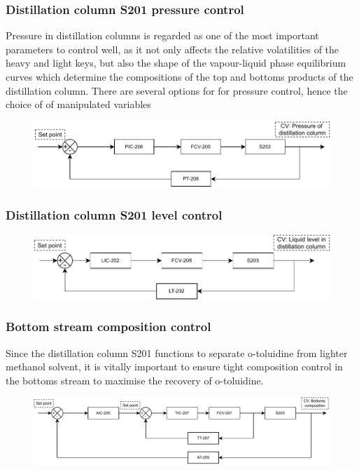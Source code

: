 \subsubsection{Distillation column S201 pressure control}
Pressure in distillation columns is regarded as one of the most important parameters to control well, as it not only affects the relative volatilities of the heavy and light keys, but also the shape of the vapour-liquid phase equilibrium curves which determine the compositions of the top and bottoms products of the distillation column. There are several options for for pressure control, hence the choice of of manipulated variables 
\begin{figure}[H]
    \centering
    \includegraphics[width=\linewidth]{chapters/4-operation-control/4-Figures/S203-PC.pdf}
    \caption{}
    \label{fig:S203-PC}
\end{figure}

\subsubsection{Distillation column S201 level control}
\begin{figure}[H]
    \centering
    \includegraphics[width=\linewidth]{chapters/4-operation-control/4-Figures/S203-LC.pdf}
    \caption{}
    \label{fig:S203-LC}
\end{figure}

\subsubsection{Bottom stream composition control}
Since the distillation column S201 functions to separate o-toluidine from lighter methanol solvent, it is vitally important to ensure tight composition control in the bottoms stream to maximise the recovery of o-toluidine. 
\begin{figure}[H]
    \centering
    \includegraphics[width=\linewidth]{chapters/4-operation-control/4-Figures/S203-CC.pdf}
    \caption{}
    \label{fig:S203-CC}
\end{figure}

